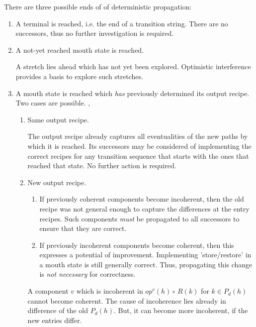 \documentclass[12pt,a4paper]{scrartcl}
\begin{document}
There are three possible ends of of deterministic propagation:

\begin{enumerate}
    \item A terminal is reached, i.e. the end of a transition string. There are 
        no successors, thus no further investigation is required. 

    \item A not-yet reached mouth state is reached. \label{itm:not-yet-reached-mouth}

        A stretch lies ahead which has not yet been explored.  Optimistic
        interference provides a basis to explore such stretches.

    \item A mouth state is reached which \textit{has} previously determined its
        output recipe. Two cases are possible.
,
        \begin{enumerate}
            \item Same output recipe.

                The output recipe already captures all eventualities of the new
                paths by which it is reached. Its successors may be considered
                of implementing the correct recipes for any transition sequence
                that starts with the ones that reached that state. No further
                action is required.

            \item New output recipe.

                \begin{enumerate}
                \item If previously coherent components become incoherent, then the
                old recipe was not general enough to capture the differences at
                the entry recipes.  Such components \textit{must} be propagated to all
                successors to ensure that they are correct. \label{itm:new-recipe-coherent-to-incoherent}
                    
                \item If previously incoherent components become coherent, then this
                expresses a potential of improvement. Implementing 'store/restore' 
                in a mouth state is still generally correct. Thus, propagating this 
                change is \textit{not necessary} for correctness.
                \label{itm:new-recipe-incoherent-to-coherent}
                \end{enumerate}
          
                A component $v$ which is incoherent in $op^v(h)\circ\,R(k)$ for
                $k\in P_d(h)$ cannot become coherent. The cause of incoherence
                lies already in difference of the old $P_d(h)$.  But, it can
                become more incoherent, if the new entries differ. 

        \end{enumerate}
        
\end{enumerate}
\end{document}
